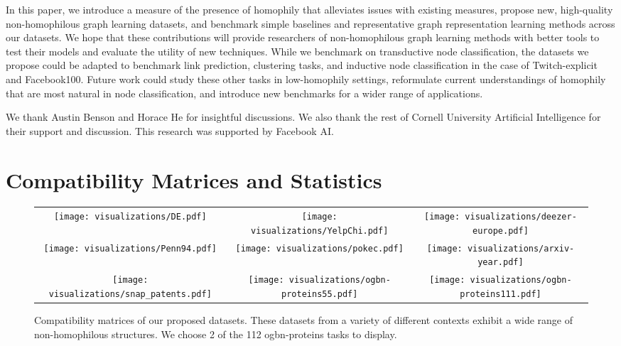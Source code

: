 \documentclass[sigconf, balance=false]{acmart}
\begin{document}
In this paper, we introduce a measure of the presence of homophily that alleviates issues with existing measures, propose new, high-quality non-homophilous graph learning datasets, and benchmark simple baselines and representative graph representation learning methods across our datasets. We hope that these contributions will provide researchers of non-homophilous graph learning methods with better tools to test their models and evaluate the utility of new techniques. 
While we benchmark on transductive node classification, the datasets we propose could be adapted to benchmark link prediction, clustering tasks, and inductive node classification in the case of Twitch-explicit and Facebook100. Future work could study these other tasks in low-homophily settings, reformulate current understandings of homophily that are most natural in node classification, and introduce new benchmarks for a wider range of applications.

\clearpage

\begin{acks}
 We thank Austin Benson and Horace He for insightful discussions. We also thank the rest of Cornell University Artificial Intelligence for their support and discussion. This research was supported by Facebook AI.
\end{acks}







\appendix

\section{Compatibility Matrices and Statistics}\label{sec:appendix_measures}


\begin{figure*}
\centering
\begin{tabular}{ccc}
    \texttt{[image: visualizations/DE.pdf]} &
    \texttt{[image: visualizations/YelpChi.pdf]} &
    \texttt{[image: visualizations/deezer-europe.pdf]} \\
     \texttt{[image: visualizations/Penn94.pdf]} & 
    \texttt{[image: visualizations/pokec.pdf]} &
    \texttt{[image: visualizations/arxiv-year.pdf]} \\
    \texttt{[image: visualizations/snap\_patents.pdf]} &
    \texttt{[image: visualizations/ogbn-proteins55.pdf]} &
    \texttt{[image: visualizations/ogbn-proteins111.pdf]} 
\end{tabular}
\caption{Compatibility matrices of our proposed datasets. These datasets from a variety of different contexts exhibit a wide range of non-homophilous structures. We choose 2 of the 112 ogbn-proteins tasks to display.}
\label{fig:compat_ours}
\end{figure*}
\end{document}
